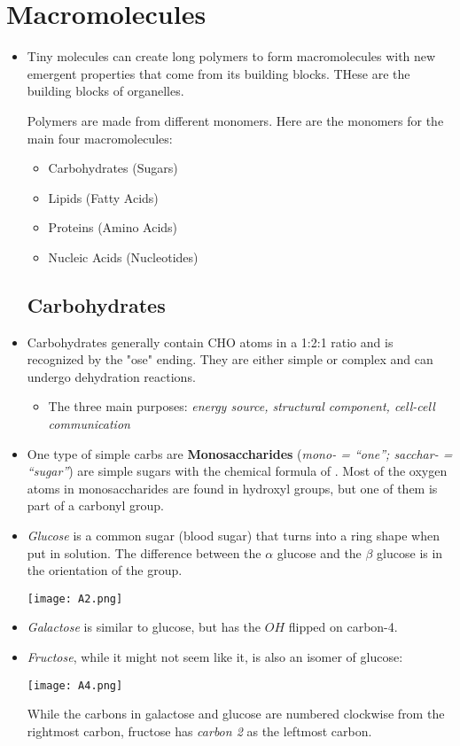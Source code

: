 \documentclass[letterpaper]{article}
\begin{document}
\section{Macromolecules}
    \begin{itemize}
    \item Tiny molecules can create long polymers to form macromolecules with new emergent properties that come from its building blocks. THese are the building blocks of organelles.
    \begin{idea}
        Polymers are made from different monomers. Here are the monomers for the main four macromolecules:
        \begin{multicols}{2}
        \begin{itemize}
            \item Carbohydrates (Sugars)
            \item Lipids (Fatty Acids)
            \item Proteins (Amino Acids)
            \item Nucleic Acids (Nucleotides)
        \end{itemize}
        \end{multicols}
    \end{idea}
    \subsection{Carbohydrates}
    \item Carbohydrates generally contain CHO atoms in a 1:2:1 ratio and is recognized by the "ose" ending. They are either simple or complex and can undergo dehydration reactions.
    \begin{itemize}
        \item The three main purposes: \textit{energy source, structural component, cell-cell communication}
    \end{itemize}
    \item One type of simple carbs are \textbf{Monosaccharides} (\textit{mono- = “one”; sacchar- = “sugar”}) are simple sugars with the chemical formula of . Most of the oxygen atoms in monosaccharides are found in hydroxyl groups, but one of them is part of a carbonyl group. 
    \item \textit{Glucose} is a common sugar (blood sugar) that turns into a ring shape when put in solution. The difference between the $\alpha$ glucose and the $\beta$ glucose is in the orientation of the  group.
    \begin{center}\texttt{[image: A2.png]}\end{center}
    \item \textit{Galactose} is similar to glucose, but has the $OH$ flipped on carbon-4.
    \item \textit{Fructose}, while it might not seem like it, is also an isomer of glucose:
    \begin{center}\texttt{[image: A4.png]}\end{center}
    While the carbons in galactose and glucose are numbered clockwise from the rightmost carbon, fructose has \textit{carbon 2} as the leftmost carbon.


\end{itemize}
\end{document}
